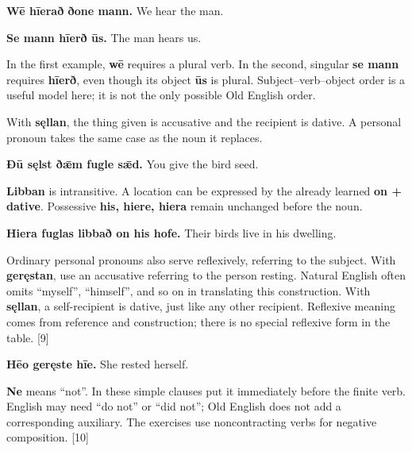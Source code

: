 \textbf{Wē hīerað ðone mann.} We hear the man.

\textbf{Se mann hīerð ūs.} The man hears us.

In the first example, \textbf{wē} requires a plural verb. In the second, singular \textbf{se mann} requires \textbf{hīerð}, even though its object \textbf{ūs} is plural. Subject–verb–object order is a useful model here; it is not the only possible Old English order.

With \textbf{sęllan}, the thing given is accusative and the recipient is dative. A personal pronoun takes the same case as the noun it replaces.

\textbf{Ðū sęlst ðǣm fugle sǣd.} You give the bird seed.

\textbf{Libban} is intransitive. A location can be expressed by the already learned \textbf{on + dative}. Possessive \textbf{his, hiere, hiera} remain unchanged before the noun.

\textbf{Hiera fuglas libbað on his hofe.} Their birds live in his dwelling.

Ordinary personal pronouns also serve reflexively, referring to the subject. With \textbf{geręstan}, use an accusative referring to the person resting. Natural English often omits “myself”, “himself”, and so on in translating this construction. With \textbf{sęllan}, a self-recipient is dative, just like any other recipient. Reflexive meaning comes from reference and construction; there is no special reflexive form in the table. [9]

\textbf{Hēo geręste hīe.} She rested herself.

\textbf{Ne} means “not”. In these simple clauses put it immediately before the finite verb. English may need “do not” or “did not”; Old English does not add a corresponding auxiliary. The exercises use noncontracting verbs for negative composition. [10]

